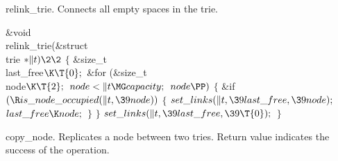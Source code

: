 relink\_trie.
Connects all empty spaces in the trie.

\Y\B\1\1\&{void} \\{relink\_trie}(\&{struct} \\{trie} ${}{*}\|t)\2\2{}$\6
${}\{{}$\1\6
\&{size\_t} \\{last\_free}${}\K\T{0};{}$\7
\&{for} (\&{size\_t} \\{node}${}\K\T{2};{}$ ${}\\{node}<\|t\MG\\{capacity};{}$
${}\\{node}\PP){}$\5
${}\{{}$\1\6
\&{if} ${}(\R\\{is\_node\_occupied}(\|t,\39\\{node})){}$\5
${}\{{}$\1\6
${}\\{set\_links}(\|t,\39\\{last\_free},\39\\{node});{}$\6
${}\\{last\_free}\K\\{node};{}$\6
\4${}\}{}$\2\6
\4${}\}{}$\2\6
${}\\{set\_links}(\|t,\39\\{last\_free},\39\T{0});{}$\6
\4${}\}{}$\2\par
\fi

copy\_node.
Replicates a node between two tries. Return value indicates the success of the
operation.

